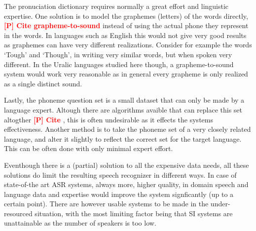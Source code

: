 \documentclass[b5paper]{article}
\newcommand{\todo}[2]{{\textcolor{red}{\bf [#1] #2 }}}
\begin{document}
The pronuciation dictionary requires normally a great effort and linguistic expertise. One solution is to model the graphemes (letters) of the words directly, \todo{P}{Cite grapheme-to-sound} instead of using the actual phone they represent in the words. In languages such as English this would not give very good results as graphemes can have very different realizations. Consider for example the words `Tough' and `Though', in writing very similar words, but when spoken very different. In the Uralic languages studied here though, a grapheme-to-sound system would work very reasonable as in general every grapheme is only realized as a single distinct sound.

Lastly, the phoneme question set is a small dataset that can only be made by a language expert. Altough there are algorithms avaible that can replace this set altogther \todo{P}{Cite}, this is often undesirable as it effects the systems effectiveness. Another method is to take the phoneme set of a very closely related language, and alter it slightly to reflect the correct set for the target language. This can be often done with only minimal expert effort.

Eventhough there is a (partial) solution to all the expensive data needs, all these solutions do limit the resulting speech recognizer in different ways. In case of state-of-the art ASR systems, always more, higher quality, in domain speech and language data and expertise would improve the system signficantly (up to a certain point). There are however usable systems to be made in the under-resourced situation, with the most limiting factor being that SI systems are unattainable as the number of speakers is too low.
\end{document}
